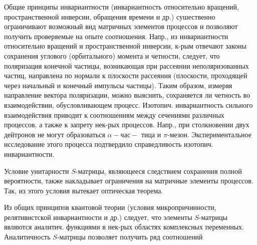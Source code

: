 \documentclass[10pt]{article}
\begin{document}
Общие принципы инвариантности (инвариантность относительно вращений, пространственной инверсии, обращения времени и др.) сушественно ограничивают возможный вид матричных элементов процессов и позволяют получить проверяемые на опыте соотношения. Напр., из инвариантности относительно вращений и пространственной инверсии, к-рым отвечают законы сохранения углового (орбитального) момента и четности, следует, что поляризация конечной частицы, возникающая при рассеянии неполяризованных частиц, направлена по нормали к плоскости рассеяния (плоскости, проходящей через начальный и конечный импульсы частицы). Таким образом, измеряя направление вектора поляризации, можно выяснить, сохраняется ли четность во взаимодействии, обусловливающем процесс. Изотопич. инвариантность сильного взаимодействия приводит к соотношениям между сечениями различных процессов, а также к запрету нек-рых процессов. Напр., при столкновении двух дейтронов не могут образоваться $\alpha-ч а с-$ тица и $\pi$-мезон. Экспериментальное исследование этого процесса подтвердило справедливость изотопич. инвариантности.



Условие унитарности $S$-матрицы, являющееся следствием сохранения полной вероятности, также накладывает ограничения на матричные элементы процессов. Так, из этого условия вытекает оптическая теорема.



Из общих принципов квантовой теории (условия микропричинности, релятивистской инвариантности и др.) следует, что элементы $S$-матрицы являются аналитич. функциями в нек-рых областях комплексных переменных. Аналитичность $S$-матрицы позволяет получить ряд соотношений
\end{document}
